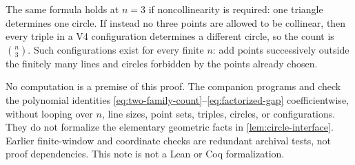 \documentclass[11pt]{article}
\theoremstyle{definition}
\theoremstyle{remark}
\begin{document}
The same formula holds at \(n=3\) if noncollinearity is required: one
triangle determines one circle.  If instead no three points are allowed to
be collinear, then every triple in a V4 configuration determines a different
circle, so the count is \(\binom n3\).  Such configurations exist for every
finite \(n\): add points successively outside the finitely many lines and
circles forbidden by the points already chosen.

No computation is a premise of this proof.  The companion programs
 and
 check the polynomial identities
\eqref{eq:two-family-count}--\eqref{eq:factorized-gap} coefficientwise,
without looping over \(n\), line sizes, point sets, triples, circles, or
configurations.  They do not formalize the elementary geometric facts in
\cref{lem:circle-interface}.  Earlier finite-window and coordinate checks
are redundant archival tests, not proof dependencies.  This note is not a
Lean or Coq formalization.
\end{document}
